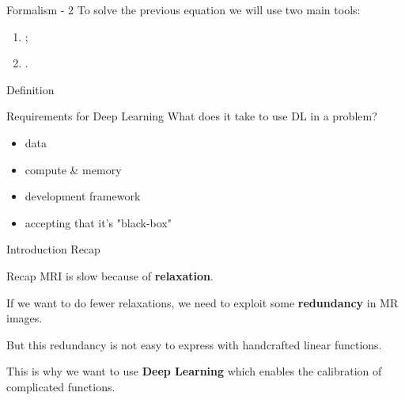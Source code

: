\begin{frame}{Formalism - 2}
    To solve the previous equation we will use two main tools:

    \begin{enumerate}
        \item {};
        \item<2> .
    \end{enumerate}


        \begin{block}{Definition}
        \end{block}

\end{frame}

\begin{frame}{Requirements for Deep Learning}
    What does it take to use DL in a problem?
    \begin{itemize}[<+->]
        \item data
        \item compute \& memory
        \item development framework
        \item accepting that it's "black-box"
    \end{itemize}
\end{frame}


\begin{frame}{Introduction Recap}
    \begin{block}{Recap}
        MRI is slow because of \textbf{relaxation}.

        \pause
        If we want to do fewer relaxations, we need to exploit some \textbf{redundancy} in MR images.

        \pause
        But this redundancy is not easy to express with handcrafted linear functions.

        \pause
        This is why we want to use \textbf{Deep Learning} which enables the calibration of complicated functions.
    \end{block}
\end{frame}
